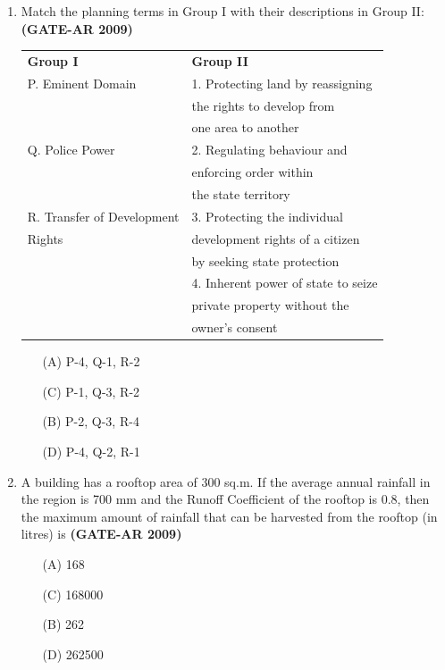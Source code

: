 \documentclass[a4paper,10pt]{article}
\begin{document}
\begin{enumerate}
    \item Match the planning terms in Group I with their descriptions in Group II: \textbf{(GATE-AR 2009)} \\
    \begin{tabular}{ l l }
	\textbf{Group I} & \textbf{Group II} \\
	P. Eminent Domain & 1. Protecting land by reassigning \\
	& the rights to develop from \\
	& one area to another \\
	Q. Police Power & 2. Regulating behaviour and \\
	& enforcing order within \\
	& the state territory \\
	R. Transfer of Development & 3. Protecting the individual \\
	Rights & development rights of a citizen \\
	& by seeking state protection \\
	& 4. Inherent power of state to seize \\
	& private property without the \\
	& owner’s consent \\
	\end{tabular}
	\begin{multicols}{2}
	\begin{itemize}
        \item[(A)] P-4, Q-1, R-2
        \item[(C)] P-1, Q-3, R-2
        \item[(B)] P-2, Q-3, R-4
        \item[(D)] P-4, Q-2, R-1
    \end{itemize}
	\end{multicols}

    \item A building has a rooftop area of 300 sq.m. If the average annual rainfall in the region is 700 mm and the Runoff Coefficient of the rooftop is 0.8, then the maximum amount of rainfall that can be harvested from the rooftop (in litres) is \textbf{(GATE-AR 2009)}
    \begin{multicols}{2}
	\begin{itemize}
        \item[(A)] 168
        \item[(C)] 168000
        \item[(B)] 262
        \item[(D)] 262500
    \end{itemize}
	\end{multicols}


\end{enumerate}
\end{document}
